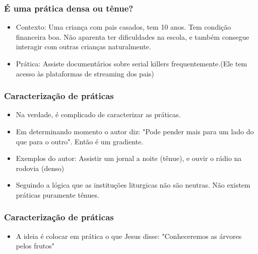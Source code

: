 \begin{frame}
	\frametitle{É uma prática densa ou tênue?}

    \begin{itemize}
        \item Contexto: Uma criança com pais casados, tem 10 anos. Tem condição financeira boa. Não aparenta ter dificuldades na escola, e também consegue interagir com outras crianças naturalmente.
        \item Prática: Assiste documentários sobre serial killers frequentemente.(Ele tem acesso às plataformas de streaming dos pais)
    \end{itemize}
\end{frame}

\begin{frame}
	\frametitle{Caracterização de práticas}

    \begin{itemize}
        \item <1>Na verdade, é complicado de caracterizar as práticas.
        \item <1>Em determinando momento o autor diz: "Pode pender mais para um lado do que para o outro". Então é um gradiente.
        \item <2> Exemplos do autor: Assistir um jornal a noite (tênue), e ouvir o rádio na rodovia (denso)
        \item <3> Seguindo a lógica que as instituções liturgicas não são neutras. Não existem práticas puramente tênues.
    \end{itemize}
\end{frame}

\begin{frame}
	\frametitle{Caracterização de práticas}

    \begin{itemize}
        \item A ideia é colocar em prática o que Jesus disse: "Conheceremos as árvores pelos frutos"
    \end{itemize}
\end{frame}
